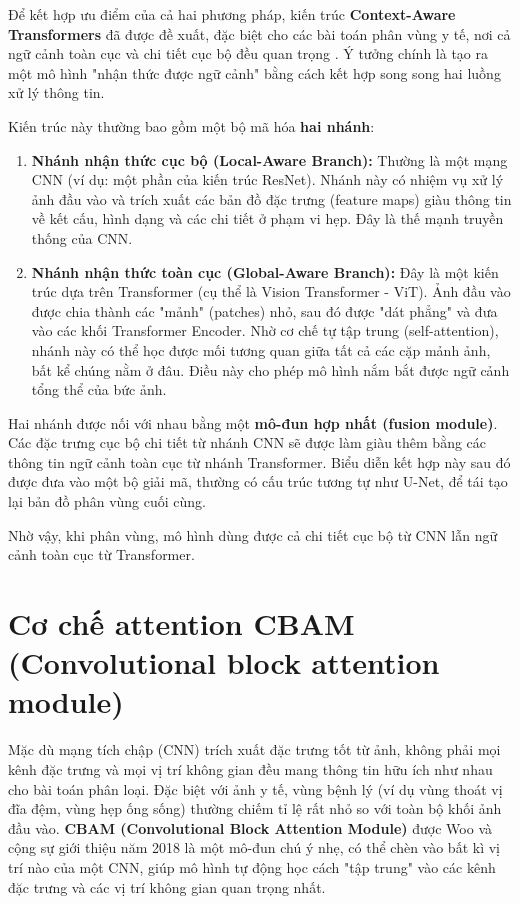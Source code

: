Để kết hợp ưu điểm của cả hai phương pháp, kiến trúc \textbf{Context-Aware Transformers} đã được đề xuất, đặc biệt cho các bài toán phân vùng y tế, nơi cả ngữ cảnh toàn cục và chi tiết cục bộ đều quan trọng \cite{windsor2022context}. Ý tưởng chính là tạo ra một mô hình "nhận thức được ngữ cảnh" bằng cách kết hợp song song hai luồng xử lý thông tin.

Kiến trúc này thường bao gồm một bộ mã hóa \textbf{hai nhánh}:
\begin{enumerate}
    \item \textbf{Nhánh nhận thức cục bộ (Local-Aware Branch):} Thường là một mạng CNN (ví dụ: một phần của kiến trúc ResNet). Nhánh này có nhiệm vụ xử lý ảnh đầu vào và trích xuất các bản đồ đặc trưng (feature maps) giàu thông tin về kết cấu, hình dạng và các chi tiết ở phạm vi hẹp. Đây là thế mạnh truyền thống của CNN.

    \item \textbf{Nhánh nhận thức toàn cục (Global-Aware Branch):} Đây là một kiến trúc dựa trên Transformer (cụ thể là Vision Transformer - ViT). Ảnh đầu vào được chia thành các "mảnh" (patches) nhỏ, sau đó được "dát phẳng" và đưa vào các khối Transformer Encoder. Nhờ cơ chế tự tập trung (self-attention), nhánh này có thể học được mối tương quan giữa tất cả các cặp mảnh ảnh, bất kể chúng nằm ở đâu. Điều này cho phép mô hình nắm bắt được ngữ cảnh tổng thể của bức ảnh.
\end{enumerate}

Hai nhánh được nối với nhau bằng một \textbf{mô-đun hợp nhất (fusion module)}. Các đặc trưng cục bộ chi tiết từ nhánh CNN sẽ được làm giàu thêm bằng các thông tin ngữ cảnh toàn cục từ nhánh Transformer. Biểu diễn kết hợp này sau đó được đưa vào một bộ giải mã, thường có cấu trúc tương tự như U-Net, để tái tạo lại bản đồ phân vùng cuối cùng.

Nhờ vậy, khi phân vùng, mô hình dùng được cả chi tiết cục bộ từ CNN lẫn ngữ cảnh toàn cục từ Transformer.

\section{Cơ chế attention CBAM (Convolutional block attention module)}
\label{sec:cbam_theory}
Mặc dù mạng tích chập (CNN) trích xuất đặc trưng tốt từ ảnh, không phải mọi kênh đặc trưng và mọi vị trí không gian đều mang thông tin hữu ích như nhau cho bài toán phân loại. Đặc biệt với ảnh y tế, vùng bệnh lý (ví dụ vùng thoát vị đĩa đệm, vùng hẹp ống sống) thường chiếm tỉ lệ rất nhỏ so với toàn bộ khối ảnh đầu vào. \textbf{CBAM (Convolutional Block Attention Module)} được Woo và cộng sự \cite{woo2018cbam} giới thiệu năm 2018 là một mô-đun chú ý nhẹ, có thể chèn vào bất kì vị trí nào của một CNN, giúp mô hình tự động học cách "tập trung" vào các kênh đặc trưng và các vị trí không gian quan trọng nhất.

